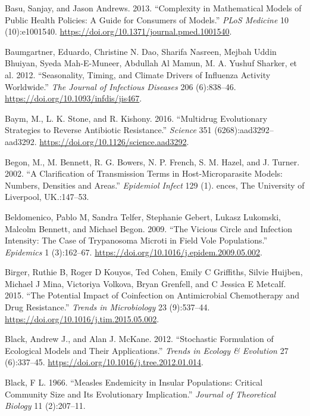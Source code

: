 \documentclass[]{book}
\theoremstyle{definition}
\theoremstyle{definition}
\theoremstyle{definition}
\theoremstyle{remark}
\begin{document}
\leavevmode\hypertarget{ref-basu13}{}%
Basu, Sanjay, and Jason Andrews. 2013. ``Complexity in Mathematical
Models of Public Health Policies: A Guide for Consumers of Models.''
\emph{PLoS Medicine} 10 (10):e1001540.
\url{https://doi.org/10.1371/journal.pmed.1001540}.

\leavevmode\hypertarget{ref-baumgartner12}{}%
Baumgartner, Eduardo, Christine N. Dao, Sharifa Nasreen, Mejbah Uddin
Bhuiyan, Syeda Mah-E-Muneer, Abdullah Al Mamun, M. A. Yushuf Sharker, et
al. 2012. ``Seasonality, Timing, and Climate Drivers of Influenza
Activity Worldwide.'' \emph{The Journal of Infectious Diseases} 206
(6):838--46. \url{https://doi.org/10.1093/infdis/jis467}.

\leavevmode\hypertarget{ref-baym16}{}%
Baym, M., L. K. Stone, and R. Kishony. 2016. ``Multidrug Evolutionary
Strategies to Reverse Antibiotic Resistance.'' \emph{Science} 351
(6268):aad3292--aad3292. \url{https://doi.org/10.1126/science.aad3292}.

\leavevmode\hypertarget{ref-begon02}{}%
Begon, M., M. Bennett, R. G. Bowers, N. P. French, S. M. Hazel, and J.
Turner. 2002. ``A Clarification of Transmission Terms in
Host-Microparasite Models: Numbers, Densities and Areas.''
\emph{Epidemiol Infect} 129 (1). ences, The University of Liverpool,
UK.:147--53.

\leavevmode\hypertarget{ref-beldomenico09}{}%
Beldomenico, Pablo M, Sandra Telfer, Stephanie Gebert, Lukasz Lukomski,
Malcolm Bennett, and Michael Begon. 2009. ``The Vicious Circle and
Infection Intensity: The Case of Trypanosoma Microti in Field Vole
Populations.'' \emph{Epidemics} 1 (3):162--67.
\url{https://doi.org/10.1016/j.epidem.2009.05.002}.

\leavevmode\hypertarget{ref-birger15}{}%
Birger, Ruthie B, Roger D Kouyos, Ted Cohen, Emily C Griffiths, Silvie
Huijben, Michael J Mina, Victoriya Volkova, Bryan Grenfell, and C
Jessica E Metcalf. 2015. ``The Potential Impact of Coinfection on
Antimicrobial Chemotherapy and Drug Resistance.'' \emph{Trends in
Microbiology} 23 (9):537--44.
\url{https://doi.org/10.1016/j.tim.2015.05.002}.

\leavevmode\hypertarget{ref-black12}{}%
Black, Andrew J., and Alan J. McKane. 2012. ``Stochastic Formulation of
Ecological Models and Their Applications.'' \emph{Trends in Ecology \&
Evolution} 27 (6):337--45.
\url{https://doi.org/10.1016/j.tree.2012.01.014}.

\leavevmode\hypertarget{ref-black66}{}%
Black, F L. 1966. ``Measles Endemicity in Insular Populations: Critical
Community Size and Its Evolutionary Implication.'' \emph{Journal of
Theoretical Biology} 11 (2):207--11.
\end{document}
